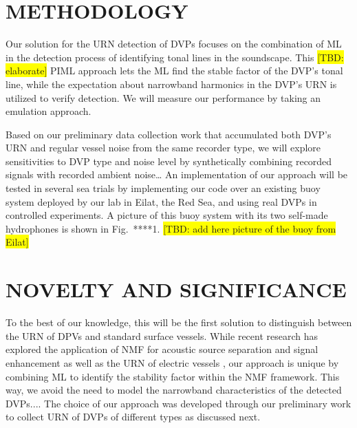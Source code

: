 \documentclass[12pt,a4paper]{article}
\begin{document}
\section{METHODOLOGY}
Our solution for the URN detection of DVPs focuses on the combination of ML in the detection process of
identifying tonal lines in the soundscape. This \colorbox{yellow}{[TBD: elaborate]} PIML approach lets the ML find the stable
factor of the DVP's tonal line, while the expectation about narrowband harmonics in the DVP's URN is
utilized to verify detection. We will measure our performance by taking an emulation approach.

Based on our preliminary data collection work that accumulated both DVP's URN and regular vessel noise
from the same recorder type, we will explore sensitivities to DVP type and noise level by synthetically
combining recorded signals with recorded ambient noise… An implementation of our approach will be
tested in several sea trials by implementing our code over an existing buoy system deployed by our lab in
Eilat, the Red Sea, and using real DVPs in controlled experiments. A picture of this buoy system with its two self-made hydrophones is shown in Fig.~****1. \colorbox{yellow}{[TBD: add here picture of the buoy from Eilat]}

\section{NOVELTY AND SIGNIFICANCE}
To the best of our knowledge, this will be the first solution to distinguish between the URN of DPVs and
standard surface vessels. While recent research has explored the application of NMF for acoustic source
separation and signal enhancement \cite{chanNonNegativeMatrixFactorizationConvolutional2019} as well as the URN of electric vessels \cite{kitaAdvancesPassiveAcoustic2022},
our approach is unique by combining ML to identify the stability factor within the NMF framework. This way,
we avoid the need to model the narrowband characteristics of the detected DVPs.... The choice of our
approach was developed through our preliminary work to collect URN of DVPs of different types as
discussed next.
\end{document}
